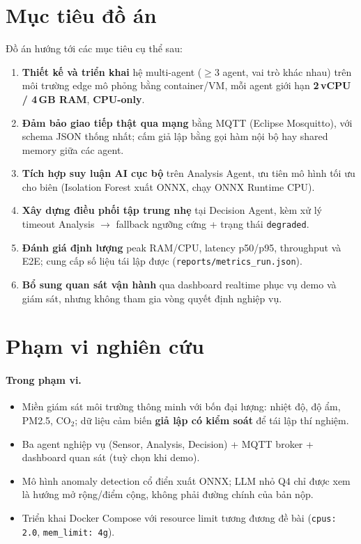 \documentclass[12pt,a4paper,oneside]{report}
\newcommand{\code}[1]{\texttt{#1}}
\begin{document}
\section{Mục tiêu đồ án}

Đồ án hướng tới các mục tiêu cụ thể sau:
\begin{enumerate}
  \item \textbf{Thiết kế và triển khai} hệ multi-agent ($\geq 3$ agent, vai trò khác nhau) trên môi trường edge mô phỏng bằng container/VM, mỗi agent giới hạn \textbf{2\,vCPU / 4\,GB RAM}, \textbf{CPU-only}.
  \item \textbf{Đảm bảo giao tiếp thật qua mạng} bằng MQTT (Eclipse Mosquitto), với schema JSON thống nhất; cấm giả lập bằng gọi hàm nội bộ hay shared memory giữa các agent.
  \item \textbf{Tích hợp suy luận AI cục bộ} trên Analysis Agent, ưu tiên mô hình tối ưu cho biên (Isolation Forest xuất ONNX, chạy ONNX Runtime CPU).
  \item \textbf{Xây dựng điều phối tập trung nhẹ} tại Decision Agent, kèm xử lý timeout Analysis $\rightarrow$ fallback ngưỡng cứng + trạng thái \code{degraded}.
  \item \textbf{Đánh giá định lượng} peak RAM/CPU, latency p50/p95, throughput và E2E; cung cấp số liệu tái lập được (\code{reports/metrics\_run.json}).
  \item \textbf{Bổ sung quan sát vận hành} qua dashboard realtime phục vụ demo và giám sát, nhưng không tham gia vòng quyết định nghiệp vụ.
\end{enumerate}

\section{Phạm vi nghiên cứu}

\paragraph{Trong phạm vi.}
\begin{itemize}
  \item Miền giám sát môi trường thông minh với bốn đại lượng: nhiệt độ, độ ẩm, PM2.5, CO$_2$; dữ liệu cảm biến \textbf{giả lập có kiểm soát} để tái lập thí nghiệm.
  \item Ba agent nghiệp vụ (Sensor, Analysis, Decision) + MQTT broker + dashboard quan sát (tuỳ chọn khi demo).
  \item Mô hình anomaly detection cổ điển xuất ONNX; LLM nhỏ Q4 chỉ được xem là hướng mở rộng/điểm cộng, không phải đường chính của bản nộp.
  \item Triển khai Docker Compose với resource limit tương đương đề bài (\code{cpus: 2.0}, \code{mem\_limit: 4g}).
\end{itemize}
\end{document}
